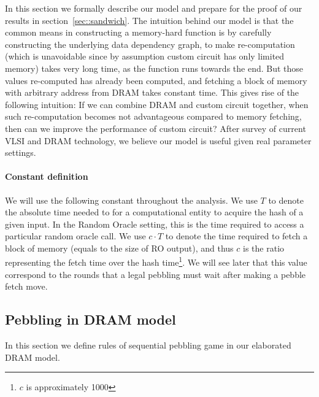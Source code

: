 In this section we formally describe our model and prepare for the proof of our results in section~\ref{sec::sandwich}. The intuition behind
our model is that the common means in constructing a memory-hard function is by carefully constructing the underlying data dependency graph,
to make re-computation (which is unavoidable since by assumption custom circuit has only limited memory) takes very long time, as the function
runs towards the end. But those values re-computed has already been computed, and fetching a block of memory with arbitrary address from DRAM
takes constant time. This gives rise of the following intuition: If we can combine DRAM and custom circuit together, when such re-computation
becomes not advantageous compared to memory fetching, then can we improve the performance of custom circuit? After survey of current VLSI and
DRAM technology, we believe our model is useful given real parameter settings.

\paragraph{Constant definition}
We will use the following constant throughout the analysis. We use $T$ to denote the absolute time needed to for a computational entity to acquire
the hash of a given input. In the Random Oracle setting, this is the time required to access a particular random oracle call. We use $c \cdot T$
to denote the time required to fetch a block of memory (equals to the size of RO output), and thus $c$ is the ratio representing the fetch time over
the hash time\footnote{$c$ is approximately 1000}.
We will see later that this value correspond to the rounds that a legal pebbling must wait after making a pebble fetch move.

\subsection{Pebbling in DRAM model}

In this section we define rules of sequential pebbling game in our elaborated DRAM model.


